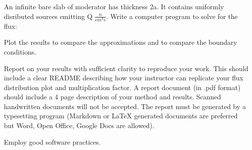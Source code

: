 \documentclass[11pt]{exam}
\begin{document}
\begin{questions}
        \question[30] An infinite bare slab of moderator has thickness 2a. It 
        contains uniformly disributed sources emitting Q $\frac{n}{cm^3s}$. 
        Write a computer program to solve for the flux:
        

        Plot the results to compare the approximations and to compare the 
        boundary conditions.

        \question[30] Report on your results with sufficient clarity to reproduce 
        your work. This should include a clear README describing how your 
        instructor can replicate your flux distribution plot and multiplication 
        factor. A report document (in .pdf format) should include a 4 page description of your method and results.
        Scanned handwritten documents will not be accepted. The report must be generated by a typesetting 
        program (Markdown or LaTeX generated documents are preferred but Word, 
        Open Office, Google Docs are allowed).

	\question Employ good software practices.
\end{questions}
\end{document}
